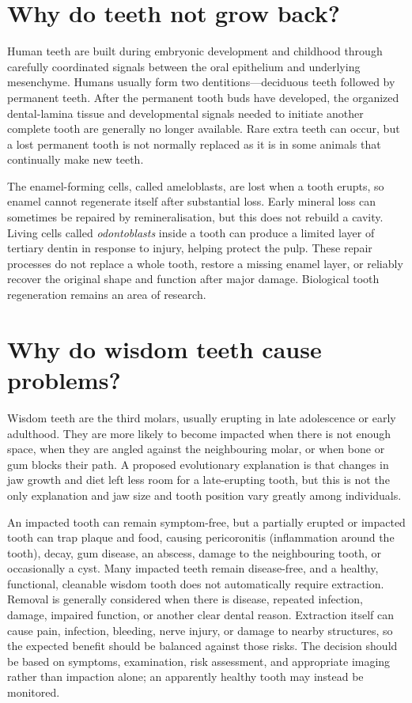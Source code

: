 \documentclass[11pt,oneside]{report}
\begin{document}
\section{Why do teeth not grow back?}

Human teeth are built during embryonic development and childhood through
carefully coordinated signals between the oral epithelium and underlying
mesenchyme. Humans usually form two dentitions---deciduous teeth followed by
permanent teeth. After the permanent tooth buds have developed, the organized
dental-lamina tissue and developmental signals needed to initiate another
complete tooth are generally no longer available. Rare extra teeth can occur,
but a lost permanent tooth is not normally replaced as it is in some animals
that continually make new teeth.

The enamel-forming cells, called ameloblasts, are lost when a tooth erupts, so
enamel cannot regenerate itself after substantial loss. Early mineral loss can
sometimes be repaired by remineralisation, but this does not rebuild a cavity.
Living cells called \emph{odontoblasts} inside a tooth can produce a limited
layer of tertiary dentin in response to injury, helping protect the pulp. These repair processes do not
replace a whole tooth, restore a missing enamel layer, or reliably recover the
original shape and function after major damage. Biological tooth regeneration
remains an area of research.

\section{Why do wisdom teeth cause problems?}

Wisdom teeth are the third molars, usually erupting in late adolescence or
early adulthood. They are more likely to become impacted when there is not
enough space, when they are angled against the neighbouring molar, or when
bone or gum blocks their path. A proposed evolutionary explanation is that
changes in jaw growth and diet left less room for a late-erupting tooth, but
this is not the only explanation and jaw size and tooth position vary greatly
among individuals.

An impacted tooth can remain symptom-free, but a partially erupted or impacted
tooth can trap plaque and food, causing
pericoronitis (inflammation around the tooth), decay, gum disease, an abscess,
damage to the neighbouring tooth, or occasionally a cyst. Many impacted teeth
remain disease-free, and a healthy, functional, cleanable wisdom tooth does
not automatically require extraction. Removal is generally considered when
there is disease, repeated infection, damage, impaired function, or another
clear dental reason. Extraction itself can cause pain, infection, bleeding,
nerve injury, or damage to nearby structures, so the expected benefit should be
balanced against those risks. The decision should be based on symptoms,
examination, risk assessment, and appropriate imaging rather than impaction alone;
an apparently healthy tooth may instead be monitored.
\end{document}
